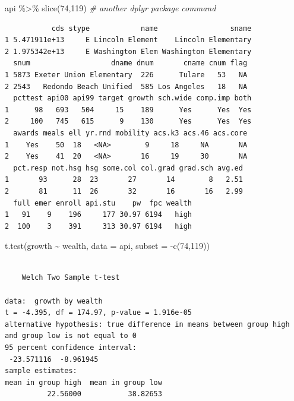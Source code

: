 \documentclass[
]{book}
\newenvironment{Shaded}{\begin{snugshade}}{\end{snugshade}}
\newcommand{\AttributeTok}[1]{\textcolor[rgb]{0.77,0.63,0.00}{#1}}
\newcommand{\CommentTok}[1]{\textcolor[rgb]{0.56,0.35,0.01}{\textit{#1}}}
\newcommand{\DecValTok}[1]{\textcolor[rgb]{0.00,0.00,0.81}{#1}}
\newcommand{\FunctionTok}[1]{\textcolor[rgb]{0.00,0.00,0.00}{#1}}
\newcommand{\NormalTok}[1]{#1}
\newcommand{\SpecialCharTok}[1]{\textcolor[rgb]{0.00,0.00,0.00}{#1}}
\begin{document}
\begin{Shaded}
\begin{Highlighting}[]
\NormalTok{api }\SpecialCharTok{\%\textgreater{}\%} \FunctionTok{slice}\NormalTok{(}\DecValTok{74}\NormalTok{,}\DecValTok{119}\NormalTok{)  }\CommentTok{\# another dplyr package command}
\end{Highlighting}
\end{Shaded}

\begin{verbatim}
           cds stype            name                 sname
1 5.471911e+13     E Lincoln Element    Lincoln Elementary
2 1.975342e+13     E Washington Elem Washington Elementary
  snum                   dname dnum       cname cnum flag
1 5873 Exeter Union Elementary  226      Tulare   53   NA
2 2543   Redondo Beach Unified  585 Los Angeles   18   NA
  pcttest api00 api99 target growth sch.wide comp.imp both
1      98   693   504     15    189      Yes      Yes  Yes
2     100   745   615      9    130      Yes      Yes  Yes
  awards meals ell yr.rnd mobility acs.k3 acs.46 acs.core
1    Yes    50  18   <NA>        9     18     NA       NA
2    Yes    41  20   <NA>       16     19     30       NA
  pct.resp not.hsg hsg some.col col.grad grad.sch avg.ed
1       93      28  23       27       14        8   2.51
2       81      11  26       32       16       16   2.99
  full emer enroll api.stu    pw  fpc wealth
1   91    9    196     177 30.97 6194   high
2  100    3    391     313 30.97 6194   high
\end{verbatim}

\begin{Shaded}
\begin{Highlighting}[]
\FunctionTok{t.test}\NormalTok{(growth }\SpecialCharTok{\textasciitilde{}}\NormalTok{ wealth, }\AttributeTok{data =}\NormalTok{ api, }\AttributeTok{subset =} \SpecialCharTok{{-}}\FunctionTok{c}\NormalTok{(}\DecValTok{74}\NormalTok{,}\DecValTok{119}\NormalTok{))}
\end{Highlighting}
\end{Shaded}

\begin{verbatim}

    Welch Two Sample t-test

data:  growth by wealth
t = -4.395, df = 174.97, p-value = 1.916e-05
alternative hypothesis: true difference in means between group high and group low is not equal to 0
95 percent confidence interval:
 -23.571116  -8.961945
sample estimates:
mean in group high  mean in group low 
          22.56000           38.82653 
\end{verbatim}
\end{document}
